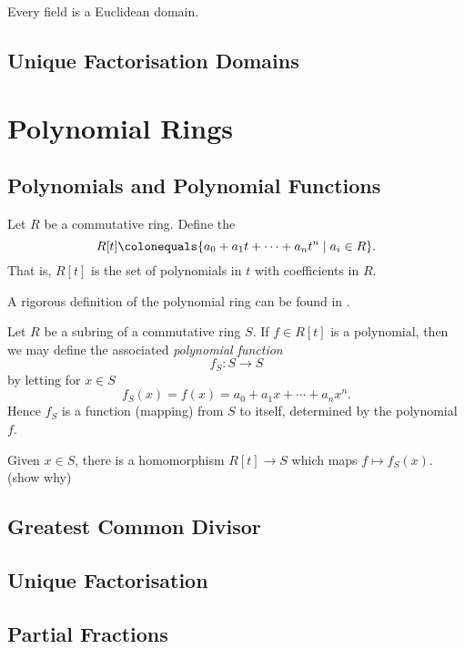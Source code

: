 \begin{proposition}
Every field is a Euclidean domain.
\end{proposition}

\subsection{Unique Factorisation Domains}

\pagebreak

\section{Polynomial Rings}
\subsection{Polynomials and Polynomial Functions}
Let $R$ be a commutative ring.
Define the 
\[R[t]\colonequals\{a_0+a_1t+\cdots+a_nt^n\mid a_i\in R\}.\]
That is, $R[t]$ is the set of polynomials in $t$ with coefficients in $R$.

\begin{remark}
A rigorous definition of the polynomial ring can be found in \cite{lang-undergrad-algebra}.
\end{remark}

Let $R$ be a subring of a commutative ring $S$. If $f\in R[t]$ is a polynomial, then we may define the associated \emph{polynomial function}
\[f_S\colon S\to S\]
by letting for $x\in S$
\[f_S(x)=f(x)=a_0+a_1x+\cdots+a_nx^n.\]
Hence $f_S$ is a function (mapping) from $S$ to itself, determined by the polynomial $f$. 

Given $x\in S$, there is a homomorphism $R[t]\to S$ which maps $f\mapsto f_S(x)$.
(show why)



\subsection{Greatest Common Divisor}

\subsection{Unique Factorisation}

\subsection{Partial Fractions}

